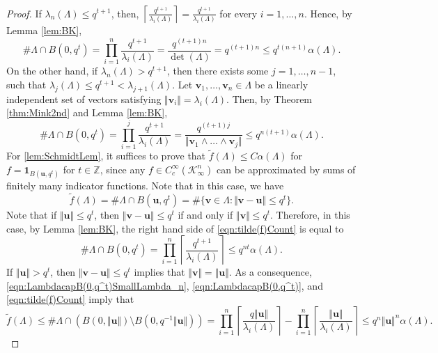 \documentclass[11pt,a4paper,reqno]{amsart}
\theoremstyle{definition}
\theoremstyle{remark}
\numberwithin{equation}{section}
\begin{document}
\begin{proof}
    If $\lambda_n(\Lambda)\leq q^{t+1}$, then, $\left\lceil\frac{q^{t+1}}{\lambda_i(\Lambda)}\right\rceil=\frac{q^{t+1}}{\lambda_i(\Lambda)}$ for every $i=1,\dots,n$. Hence, by Lemma \ref{lem:BK}, 
    \begin{equation}
    \label{eqn:LambdacapB(0,q^t)SmallLambda_n}
        \#\Lambda\cap B(0,q^t)=\prod_{i=1}^n\frac{q^{t+1}}{\lambda_i(\Lambda)}=\frac{q^{(t+1)n}}{\det(\Lambda)}=q^{(t+1)n}\leq q^{t(n+1)}\alpha(\Lambda).
    \end{equation}
    On the other hand, if $\lambda_n(\Lambda)>q^{t+1}$, then there exists some $j=1,\dots,n-1$, such that $\lambda_j(\Lambda)\leq q^{t+1}<\lambda_{j+1}(\Lambda)$. Let $\mathbf{v}_1,\dots,\mathbf{v}_n\in \Lambda$ be a linearly independent set of vectors satisfying $\Vert \mathbf{v}_i\Vert=\lambda_i(\Lambda)$. Then, by Theorem \ref{thm:Mink2nd} and Lemma \ref{lem:BK},
    \begin{equation}
    \label{eqn:LambdacapB(0,q^t)}
        \#\Lambda\cap B(0,q^t)=\prod_{i=1}^j\frac{q^{t+1}}{\lambda_i(\Lambda)}=\frac{q^{(t+1)j}}{\Vert \mathbf{v}_1\wedge \dots \wedge \mathbf{v}_j\Vert}\leq q^{n(t+1)}\alpha(\Lambda).
    \end{equation}
    For \eqref{lem:SchmidtLem}, it suffices to prove that $\widetilde{f}(\Lambda)\leq C\alpha(\Lambda)$ for $f=\mathbf{1}_{B(\mathbf{u},q^t)}$ for $t\in\mathbb{Z}$, since any $f\in C_c^{\infty}(\mathcal{K}_{\infty}^n)$ can be approximated by sums of finitely many indicator functions. Note that in this case, we have
    \begin{equation}
    \label{eqn:tilde(f)Count}
        \widetilde{f}(\Lambda)=\#\Lambda\cap B(\mathbf{u},q^t)=\#\{\mathbf{v}\in \Lambda:\Vert \mathbf{v}-\mathbf{u}\Vert\leq q^{t}\}.
    \end{equation}
    Note that if $\Vert \mathbf{u}\Vert\leq q^t$, then $\Vert \mathbf{v}-\mathbf{u}\Vert\leq q^t$ if and only if $\Vert \mathbf{v}\Vert\leq q^t$. Therefore, in this case, by Lemma \ref{lem:BK}, the right hand side of \eqref{eqn:tilde(f)Count} is equal to
    \begin{equation}
    \label{eqn:BallCntAlphaBND}
        \#\Lambda\cap B(0,q^t)=\prod_{i=1}^n\left\lceil\frac{q^{t+1}}{\lambda_i(\Lambda)}\right\rceil\leq q^{nt}\alpha(\Lambda).
    \end{equation}
    If $\Vert \mathbf{u}\Vert>q^t$, then $\Vert \mathbf{v}-\mathbf{u}\Vert\leq q^t$ implies that $\Vert \mathbf{v}\Vert=\Vert \mathbf{u}\Vert$. As a consequence,  \eqref{eqn:LambdacapB(0,q^t)SmallLambda_n}, \eqref{eqn:LambdacapB(0,q^t)}, and \eqref{eqn:tilde(f)Count} imply that
    \begin{equation*}
        \widetilde{f}(\Lambda)\leq \#\Lambda\cap \left(B(0,\Vert \mathbf{u}\Vert)\setminus B(0,q^{-1}\Vert \mathbf{u}\Vert)\right)=\prod_{i=1}^n\left\lceil \frac{q\Vert \mathbf{u}\Vert}{\lambda_i(\Lambda)}\right\rceil-\prod_{i=1}^n\left\lceil\frac{\Vert \mathbf{u}\Vert}{\lambda_i(\Lambda)}\right\rceil\leq q^n\Vert \mathbf{u}\Vert^n\alpha(\Lambda).
    \end{equation*}
\end{proof}
\end{document}
